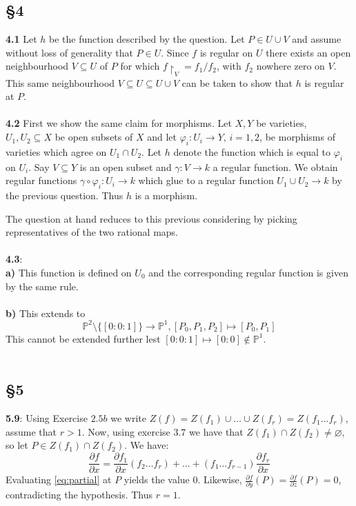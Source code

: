 \documentclass[12pt]{article}
\numberwithin{thm}{subsection}
\numberwithin{defn}{subsection}
\numberwithin{lemma}{subsection}
\numberwithin{example}{subsection}
\numberwithin{notation}{subsection}
\numberwithin{cor}{subsection}
\numberwithin{remark}{subsection}
\numberwithin{condition}{subsection}
\numberwithin{question}{subsection}
\numberwithin{construction}{subsection}
\numberwithin{construction}{subsection}
\numberwithin{construction}{subsection}
\newcommand{\bb}[1]{\mathbb{#1}}
\newcommand{\lto}{\longrightarrow}
\begin{document}
\subsection{\S 4}
\textbf{4.1} Let $h$ be the function described by the question. Let $P \in U \cup V$ and assume without loss of generality that $P \in U$. Since $f$ is regular on $U$ there exists an open neighbourhood $V \subseteq U$ of $P$ for which $f\restriction_{V} = f_1/f_2$, with $f_2$ nowhere zero on $V$. This same neighbourhood $V \subseteq U \subseteq U \cup V$ can be taken to show that $h$ is regular at $P$.\\\\
%
\textbf{4.2} First we show the same claim for morphisms. Let $X,Y$ be varieties, $U_1,U_2 \subseteq X$ be open subsets of $X$ and let $\varphi_i: U_i \lto Y$, $i = 1,2$, be morphisms of varieties which agree on $U_1 \cap U_2$. Let $h$ denote the function which is equal to $\varphi_i$ on $U_i$. Say $V \subseteq Y$ is an open subset and $\gamma: V \lto k$ a regular function. We obtain regular functions $\gamma \circ \varphi_i: U_i \lto k$ which glue to a regular function $U_1 \cup U_2 \lto k$ by the previous question. Thus $h$ is a morphism.

The question at hand reduces to this previous considering by picking representatives of the two rational maps.\\\\
%
\textbf{4.3}:\\
\textbf{a)} This function is defined on $U_0$ and the corresponding regular function is given by the same rule.\\\\
%
\textbf{b)} This extends to $$\bb{P}^2\setminus\lbrace [0:0:1]\rbrace \lto \bb{P}^1, [P_0,P_1,P_2] \longmapsto [P_0,P_1]$$
This cannot be extended further lest $[0:0:1] \mapsto [0:0] \not\in \bb{P}^1$.\\\\
%
\subsection{\S 5}
\textbf{5.9}: Using Exercise $2.5b$ we write $Z(f) = Z(f_1) \cup \hdots \cup Z(f_r) = Z(f_1...f_r)$, assume that $r > 1$. Now, using exercise $3.7$ we have that $Z(f_1) \cap Z(f_2) \neq \varnothing$, so let $P \in Z(f_1) \cap Z(f_2)$. We have:
\begin{equation}\label{eq:partial}
\frac{\partial f}{\partial x} = \frac{\partial f_1}{\partial x}(f_2\hdots f_r) + \hdots + (f_1\hdots f_{r-1})\frac{\partial f_r}{\partial x}
\end{equation}
Evaluating \eqref{eq:partial} at $P$ yields the value $0$. Likewise, $\frac{\partial f}{\partial y}(P) = \frac{\partial f}{\partial z}(P) = 0$, contradicting the hypothesis. Thus $r = 1$.
\end{document}
